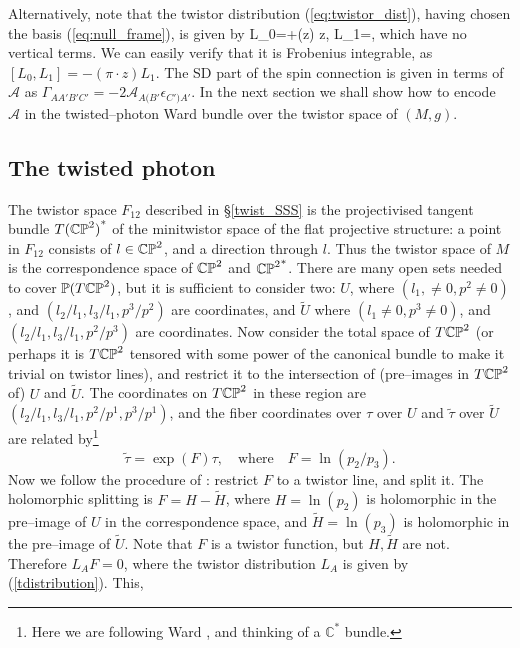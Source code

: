 Alternatively, note that the twistor distribution (\ref{eq:twistor_dist}), having chosen the basis (\ref{eq:null_frame}), is given by
\be
\label{tdistribution}
L_{0}=\pi\cdot{}+(z\cdot\pi) z\cdot{}, \quad
L_{1}=\pi\cdot{},
\ee
which have no vertical terms. We can easily verify that it is Frobenius integrable, as $[L_{0}, L_{1}]=-(\pi\cdot z)L_{1}$. The SD part of the
spin connection is given in terms of ${\mathcal A}$ as
$\Gamma_{AA'B'C'}=-2{\mathcal A}_{A(B'}\epsilon_{C')A'}$.
\koniec
In the next section we shall show how to encode
${\mathcal A}$ in the twisted--photon Ward bundle over the twistor space
of $(M, g)$.
\subsection{The twisted photon}
The twistor space $F_{12}$ described in \S\ref{twist_SSS} is the projectivised tangent bundle ${T(\mathbb{CP}^2)}^*$ of the minitwistor space of the flat projective structure: a point in $F_{12}$ consists of $l\in\mathbb{CP}^2$, and a direction through $l$. Thus the twistor space of $M$ is the correspondence space
of $\mathbb{CP}^2$ and ${\mathbb{CP}^2}^*$. 
There are many open sets needed to cover
$\mathbb{P}(T\mathbb{CP}^2)$, but it is sufficient to consider two:
$U$, where $(l_1, \neq 0, p^2\neq 0)$, and $(l_2/l_1, l_3/l_1, p^3/p^2)$ are coordinates, and $\widetilde{U}$ where
$(l_1\neq 0, p^3\neq 0)$, and  $(l_2/l_1, l_3/l_1, p^2/p^3)$
are coordinates. Now consider the total
space of $T\mathbb{CP}^2$ (or perhaps it is $T\mathbb{CP}^2$ tensored
with some power of the canonical bundle to make it trivial on twistor
lines), and restrict it to the intersection of (pre--images in
$T\mathbb{CP}^2$
of) $U$ and $\widetilde{U}$. The coordinates on $T\mathbb{CP}^2$ in these
region are $(l_2/l_1, l_3/l_1, p^2/p^1, p^3/p^1)$, and the fiber
coordinates over $\tau$ over $U$ and $\tilde{\tau}$ over 
$\widetilde{U}$ are related by\footnote{Here we are following Ward \cite{wardtf},
and thinking of a $\mathbb{C}^*$ bundle.}
\[
\tilde \tau=\exp(F)\tau, \quad\mbox{where}\quad  
F=\ln{(p_2/p_3)}.
\]
Now we follow the procedure of \cite{wardtf}: restrict $F$ to a twistor line,
and split it.
The holomorphic splitting is $F=H-\widetilde{H}$, where
$H=\ln{(p_2)}$ is holomorphic in the pre--image of $U$ in the correspondence space, and 
$\widetilde{H}=\ln{(p_3)}$ is holomorphic in the pre--image of
$\widetilde{U}$. Note that $F$ is a twistor  function, but 
$H, \widetilde{H}$ are not. Therefore
$L_{A}F=0$, where the twistor distribution $L_{A}$
is given by (\ref{tdistribution}). This, 

